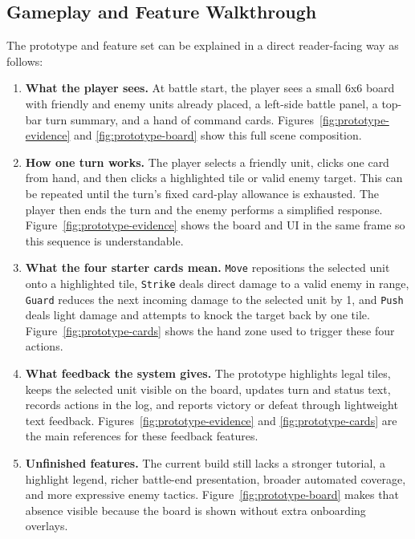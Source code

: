 \subsection{Gameplay and Feature Walkthrough}

The prototype and feature set can be explained in a direct reader-facing way as follows:

\begin{enumerate}[itemsep=5pt]
\item \textbf{What the player sees.} At battle start, the player sees a small 6x6 board with friendly and enemy units already placed, a left-side battle panel, a top-bar turn summary, and a hand of command cards. Figures~\ref{fig:prototype-evidence} and \ref{fig:prototype-board} show this full scene composition.
\item \textbf{How one turn works.} The player selects a friendly unit, clicks one card from hand, and then clicks a highlighted tile or valid enemy target. This can be repeated until the turn's fixed card-play allowance is exhausted. The player then ends the turn and the enemy performs a simplified response. Figure~\ref{fig:prototype-evidence} shows the board and UI in the same frame so this sequence is understandable.
\item \textbf{What the four starter cards mean.} \texttt{Move} repositions the selected unit onto a highlighted tile, \texttt{Strike} deals direct damage to a valid enemy in range, \texttt{Guard} reduces the next incoming damage to the selected unit by 1, and \texttt{Push} deals light damage and attempts to knock the target back by one tile. Figure~\ref{fig:prototype-cards} shows the hand zone used to trigger these four actions.
\item \textbf{What feedback the system gives.} The prototype highlights legal tiles, keeps the selected unit visible on the board, updates turn and status text, records actions in the log, and reports victory or defeat through lightweight text feedback. Figures~\ref{fig:prototype-evidence} and \ref{fig:prototype-cards} are the main references for these feedback features.
\item \textbf{Unfinished features.} The current build still lacks a stronger tutorial, a highlight legend, richer battle-end presentation, broader automated coverage, and more expressive enemy tactics. Figure~\ref{fig:prototype-board} makes that absence visible because the board is shown without extra onboarding overlays.
\end{enumerate}

